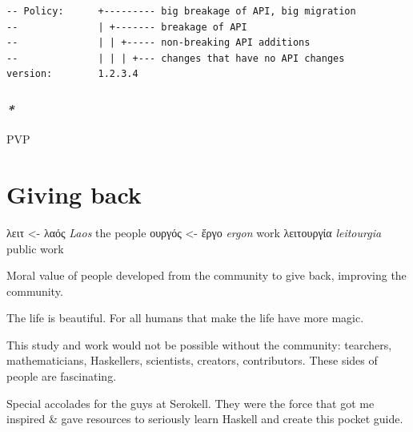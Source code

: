 \documentclass[a4paper,14pt,oneside]{book}
\begin{document}
\begin{center}

\end{center}

\begin{verbatim}
-- Policy:      +--------- big breakage of API, big migration
--              | +------- breakage of API
--              | | +----- non-breaking API additions
--              | | | +--- changes that have no API changes
version:        1.2.3.4
\end{verbatim}

\section{\emph{*}}
\label{sec:org16b49e5}

\label{org0a0610d}PVP

\part{Giving back}
\label{sec:orgbdf8a3b}

\textgreek{λειτ}       <- \textgreek{λαός}  \emph{Laos}       the people
    \textgreek{ουργός} <- \textgreek{ἔργο}  \emph{ergon}             work
\textgreek{λειτουργία}          \emph{leitourgia} public work

Moral value of people developed from the community to give back, improving the community.

The life is beautiful.
For all humans that make the life have more magic.

This study and work would not be possible without the community: tearchers, mathematicians, Haskellers, scientists, creators, contributors. These sides of people are fascinating.


Special accolades for the guys at Serokell. They were the force that got me inspired \& gave resources to seriously learn Haskell and create this pocket guide.
\end{document}
